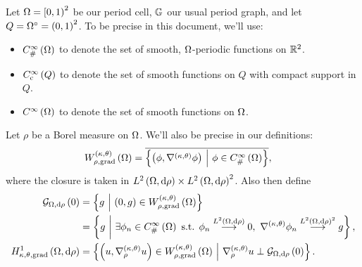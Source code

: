 \documentclass[11pt]{report}
\newcommand{\psmooth}[1]{C^{\infty}_{\#}\bracs{#1}}
\newcommand{\csmooth}[1]{C^{\infty}_{\mathrm{c}}\bracs{#1}}
\begin{document}
Let $\Omega=\left[0,1\right)^2$ be our period cell, $\mathbb{G}$ our usual period graph, and let $Q = \Omega^{\circ} = \left( 0,1 \right)^2$.
To be precise in this document, we'll use:
\begin{itemize}
	\item $\psmooth{\ddom}$ to denote the set of smooth, $\Omega$-periodic functions on $\mathbb{R}^2$.
	\item $\csmooth{Q}$ to denote the set of smooth functions on $Q$ with compact support in $Q$.
	\item $C^{\infty}\left( \Omega \right)$ to denote the set of smooth functions on $\Omega$.
\end{itemize}
Let $\rho$ be a Borel measure on $\Omega$.
We'll also be precise in our definitions:
\begin{align*}
	W^{\kt}_{\rho, \mathrm{grad}}\bracs{\ddom} &= \overline{ \clbracs{ \bracs{\phi, \ktgrad\phi} \setVert \phi\in\psmooth{\ddom} } },
\end{align*}
where the closure is taken in $L^{2}\left( \Omega,\mathrm{d}\rho \right)\times L^{2}\left( \Omega,\mathrm{d}\rho \right)^2$.
Also then define
\begin{align*}
	\gradZero{\ddom}{\rho} &= \clbracs{ g \setVert \bracs{0,g}\in W^{\kt}_{\rho, \mathrm{grad}}\bracs{\ddom} } \\
	&= \clbracs{ g \setVert \exists\phi_n\in\psmooth{\ddom} \text{ s.t. } \phi_n\lconv{\ltwo{\ddom}{\rho}}0, \ \ktgrad\phi_n\lconv{\ltwo{\ddom}{\rho}^2}g }, \\
	\ktgradSob{\ddom}{\rho} &= \clbracs{ \bracs{u,\ktgrad_{\rho}u}\in W^{\kt}_{\rho, \mathrm{grad}}\bracs{\ddom} \setVert \ktgrad_{\rho}u\perp\gradZero{\ddom}{\rho} }.
\end{align*}
\end{document}
